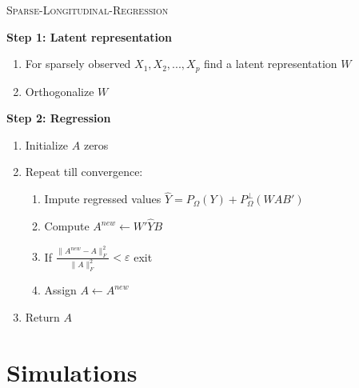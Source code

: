 \documentclass[preprint]{imsart}
\numberwithin{equation}{section}
\theoremstyle{plain}
\newcommand{\tr}[1]{{\textcolor{red}{#1}}}
\DeclareMathOperator*{\argmin}{arg\,min}
\begin{document}



\begin{algorithm}
\caption{\textsc{Sparse-Longitudinal-Regression}\label{alg:sparse-regression}}
\vspace{3pt}
\begin{flushleft}
\textbf{Step 1: Latent representation}
\end{flushleft}
\begin{enumerate}
\item For sparsely observed $X_1,X_2,...,X_p$ find a latent representation $W$
\item Orthogonalize $W$
\end{enumerate}
\begin{flushleft}
\textbf{Step 2: Regression}
\end{flushleft}
\begin{enumerate}
\item Initialize $A$ zeros
\item Repeat till convergence:
\begin{enumerate}
\item Impute regressed values $\hat{Y} = P_\Omega(Y) + P_\Omega^\perp(WAB')$
\item Compute $A^{new} \leftarrow W'\hat{Y}B$
\item If $\frac{\|A^{new} - A\|_F^2}{\|A\|_F^2} < \varepsilon$ exit
\item Assign $A \leftarrow A^{new}$
\end{enumerate}
\item Return $A$
\end{enumerate}
\end{algorithm}


\section{Simulations}\label{s:simulation}
\end{document}
